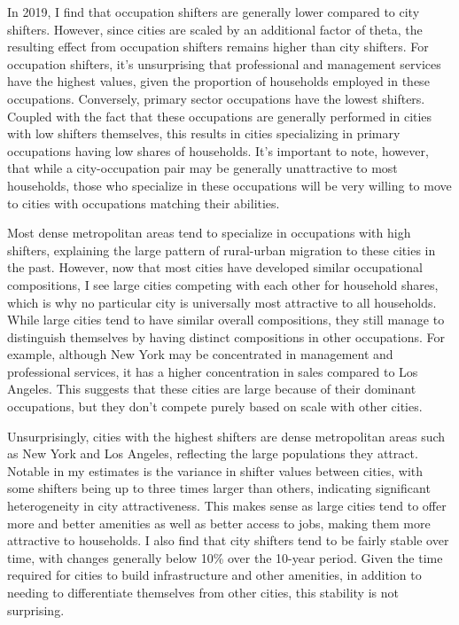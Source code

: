 \documentclass[10pt]{article}
\begin{document}
In 2019, I find that occupation shifters are generally lower compared to city shifters. However, since cities are scaled by an additional factor of theta, the resulting effect from occupation shifters remains higher than city shifters. For occupation shifters, it's unsurprising that professional and management services have the highest values, given the proportion of households employed in these occupations. Conversely, primary sector occupations have the lowest shifters. Coupled with the fact that these occupations are generally performed in cities with low shifters themselves, this results in cities specializing in primary occupations having low shares of households. It's important to note, however, that while a city-occupation pair may be generally unattractive to most households, those who specialize in these occupations will be very willing to move to cities with occupations matching their abilities.

Most dense metropolitan areas tend to specialize in occupations with high shifters, explaining the large pattern of rural-urban migration to these cities in the past. However, now that most cities have developed similar occupational compositions, I see large cities competing with each other for household shares, which is why no particular city is universally most attractive to all households. While large cities tend to have similar overall compositions, they still manage to distinguish themselves by having distinct compositions in other occupations. For example, although New York may be concentrated in management and professional services, it has a higher concentration in sales compared to Los Angeles. This suggests that these cities are large because of their dominant occupations, but they don't compete purely based on scale with other cities.

Unsurprisingly, cities with the highest shifters are dense metropolitan areas such as New York and Los Angeles, reflecting the large populations they attract. Notable in my estimates is the variance in shifter values between cities, with some shifters being up to three times larger than others, indicating significant heterogeneity in city attractiveness. This makes sense as large cities tend to offer more and better amenities as well as better access to jobs, making them more attractive to households. I also find that city shifters tend to be fairly stable over time, with changes generally below 10\% over the 10-year period. Given the time required for cities to build infrastructure and other amenities, in addition to needing to differentiate themselves from other cities, this stability is not surprising.
\end{document}
